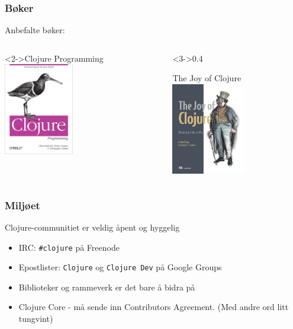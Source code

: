 \documentclass{beamer}
\begin{document}
\begin{frame}
  \frametitle{Bøker}
  Anbefalte bøker:

\begin{columns}[T]
    \begin{column}{0.4\textwidth}
      \begin{block}<2->{Clojure Programming}
        \centering
        \includegraphics[height=4cm]{img/clj-prog}
      \end{block}
    \end{column}
    \begin{column}<3->{0.4\textwidth}
      \begin{block}{The Joy of Clojure}
        \centering
        \includegraphics[height=4cm]{img/joy-of-clj}
      \end{block}
    \end{column}
  \end{columns}
\vspace{3mm}
\end{frame}

\begin{frame}
  \frametitle{Miljøet}
  Clojure-communitiet er veldig åpent og hyggelig

  \begin{itemize}
  \item<2-> IRC: {\tt \#clojure} på Freenode
  \item<3-> Epostlister: {\tt Clojure} og {\tt Clojure Dev} på Google Groups
  \item<4-> Biblioteker og rammeverk er det bare å bidra på
  \item<5-> Clojure Core - må sende inn Contributors Agreement. (Med andre ord
    litt tungvint)
  \end{itemize}
\end{frame}
\end{document}
